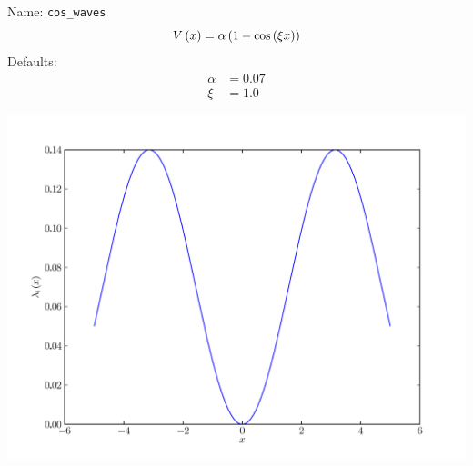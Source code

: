 \documentclass[a4paper,10pt]{report}
\begin{document}
\begin{minipage}{0.5\linewidth}
  Name:    \texttt{cos\_waves}
  \begin{equation*}
    V\left( x \right) = \alpha \left(1 - \operatorname{cos}\left(\xi x\right)\right)
  \end{equation*}
  Defaults:
  \begin{align*}
    \alpha &= 0.07 \\
    \xi &= 1.0
  \end{align*}
\end{minipage}
\begin{minipage}{0.5\linewidth}
  \begin{center}
    \includegraphics[scale=0.25]{./fig/cos_waves.pdf}
  \end{center}
\end{minipage}
\end{document}
